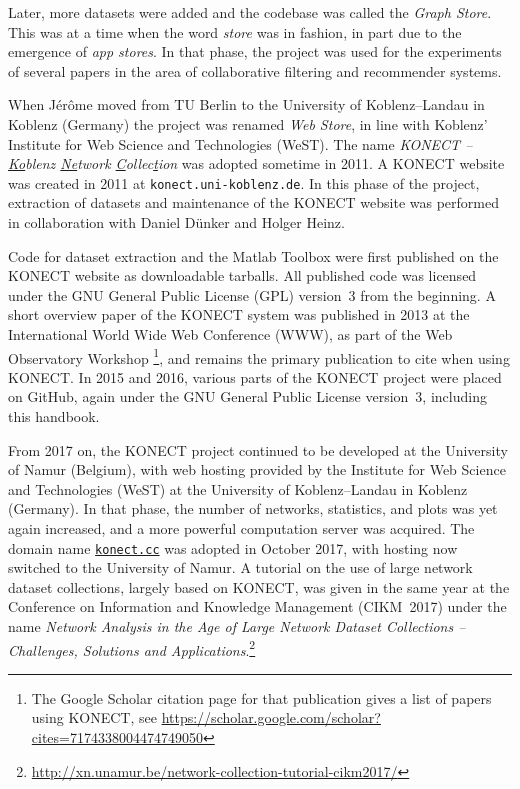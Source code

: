 \documentclass{article}
\begin{document}
Later, more datasets
were added and the codebase was called the \emph{Graph Store}.  This was
at a time when the word \emph{store} was in fashion, in part due to the
emergence of \emph{app stores}. 
In that phase, the project was used for the experiments of several papers in the area of
collaborative filtering and recommender systems.  

When Jérôme moved from
TU Berlin to the University of Koblenz--Landau in Koblenz (Germany) the
project was renamed \emph{Web Store}, in line with Koblenz' Institute
for Web Science and Technologies (WeST).  The name \emph{KONECT --
  \underline{Ko}blenz \underline{Ne}twork
  \underline{C}ollec\underline{t}ion} was adopted sometime in 2011.  A
KONECT website was created in 2011 at \texttt{konect.uni-koblenz.de}.
In this phase of the project, extraction of datasets and maintenance of the
KONECT website was performed in collaboration with Daniel Dünker and
Holger Heinz. 

Code for dataset extraction and the Matlab Toolbox were first published
on the KONECT website as downloadable tarballs.  All published code was
licensed under the GNU General Public License (GPL) version~3 from the beginning. 
A short overview paper of the KONECT system was
published in 2013 at the International World Wide Web Conference (WWW),
as part of the Web Observatory Workshop \citep{kunegis:konect}\footnote{
  The Google Scholar citation page for that publication gives a list of
  papers using KONECT, see
  \href{https://scholar.google.com/scholar?cites=7174338004474749050}{https://scholar.google.com/scholar?cites=7174338004474749050}},
and remains the primary publication to cite when using KONECT. 
In 2015 and 2016, various parts of the KONECT project were placed on
GitHub, again under the GNU
General Public License version~3, including this handbook.  

From 2017 on, the KONECT project continued to be developed at the University of
Namur (Belgium), with web hosting provided by the Institute for Web
Science and Technologies (WeST) at the University of
Koblenz--Landau in Koblenz (Germany).  In that phase, the number of
networks, statistics, and plots was yet again increased, and a more
powerful computation server was acquired.  The domain name
\href{http://konect.cc/}{\texttt{konect.cc}} was adopted in October
2017, with hosting now switched to the University of Namur. 
A tutorial on the use of large network dataset collections, largely based
on KONECT, was given in the same year at the Conference on Information and Knowledge Management (CIKM~2017) under the name \emph{Network Analysis
  in the Age of Large Network Dataset Collections -- Challenges,
  Solutions and Applications}.\footnote{\href{http://xn.unamur.be/network-collection-tutorial-cikm2017/}{http://xn.unamur.be/network-collection-tutorial-cikm2017/}}
\end{document}
